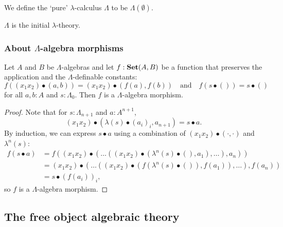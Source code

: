 \begin{definition}\label{def:pure-lambda-calculus}
  We define the `pure' $ \lambda $-calculus $ \Lambda $ to be $ \Lambda(\emptyset) $.
\end{definition}

\begin{corollary}
  $ \Lambda $ is the initial $ \lambda $-theory.
\end{corollary}

\subsubsection{About $ \Lambda $-algebra morphisms}

\begin{lemma}\label{lem:make-is-lambda-algebra-morphism}
  Let $ A $ and $ B $ be $ \Lambda $-algebras and let $ f: \mathbf{Set}(A, B) $ be a function that preserves the application and the $ \Lambda $-definable constants:
  \[ f((x_1 x_2) \bullet (a, b)) = (x_1 x_2) \bullet (f(a), f(b)) \quad \text{and} \quad f(s \bullet ()) = s \bullet () \]
  for all $ a, b: A $ and $ s: \Lambda_0 $. Then $ f $ is a $ \Lambda $-algebra morphism.
\end{lemma}
\begin{proof}
  Note that for $ s: \Lambda_{n + 1} $ and $ a: A^{n + 1} $,
  \[ (x_1 x_2) \bullet (\lambda(s) \bullet (a_i)_i, a_{n + 1}) = s \bullet a. \]
  By induction, we can express $ s \bullet a $ using a combination of $ (x_1 x_2) \bullet (\cdot, \cdot) $ and $ \lambda^n(s) $:
  \begin{align*}
    f(s \bullet a) &= f((x_1 x_2) \bullet (\dots ((x_1 x_2) \bullet (\lambda^n(s) \bullet (), a_1), \dots), a_n))\\
    &= (x_1 x_2) \bullet (\dots ((x_1 x_2) \bullet (f(\lambda^n(s) \bullet ()), f(a_1)), \dots), f(a_n))\\
    &= s \bullet (f(a_i))_i,
  \end{align*}
  so $ f $ is a $ \Lambda $-algebra morphism.
\end{proof}

\subsection{The free object algebraic theory}

